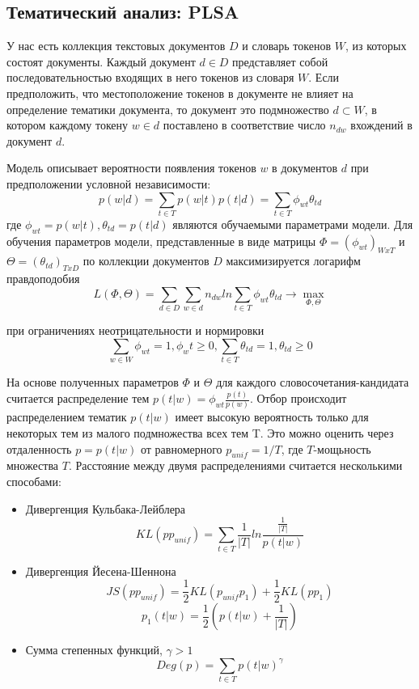\subsection*{Тематический анализ: PLSA}

У нас есть коллекция текстовых документов $D$ и словарь токенов $W$, из которых состоят документы. Каждый документ $d \in D$ представляет собой последовательностью входящих в него токенов из словаря $W$. Если предположить, что местоположение токенов в документе не влияет на определение тематики документа, то документ это подмножество $d \subset W$, в котором каждому токену $w \in d$ поставлено в соответствие число $n_{dw}$ вхождений в документ $d$.

Модель описывает вероятности появления токенов $w$ в документов $d$ при предположении условной независимости:
$$p(w|d) = \sum_{t \in T} p(w|t)p(t|d) = \sum_{t \in T} \phi_{wt} \theta_{td}$$
где $\phi_{wt} = p(w|t), \theta_{td} = p(t|d)$ являются обучаемыми параметрами модели. Для обучения параметров модели, представленные в виде матрицы $\Phi = (\phi_{wt})_{WxT}$ и $\Theta = (\theta_{td})_{TxD}$ по коллекции документов $D$ максимизируется логарифм правдоподобия
$$L(\Phi, \Theta) = \sum_{d \in D} \sum_{w \in d} n_{dw} ln \sum_{t \in T} \phi_{wt} \theta_{td} \rightarrow \max_{\Phi, \Theta}$$

при ограничениях неотрицательности и нормировки
$$\sum_{w \in W} \phi_{wt} = 1, \phi_wt \geq 0, \sum_{t \in T} \theta_{td} = 1, \theta_{td} \geq 0$$

На основе полученных параметров $\Phi$ и $\Theta$ для каждого словосочетания-кандидата считается распределение тем $p(t|w) = \phi_{wt} \frac{p(t)}{p(w)}$. Отбор происходит распределением тематик $p(t|w)$ имеет высокую вероятность только для некоторых тем из малого подмножества всех тем T. Это можно оценить через отдаленность $p = p(t|w)$ от равномерного $p_{unif} = 1/T$, где $T$-мощьность множества $T$. Расстояние между двумя распределениями считается несколькими способами:

\begin{itemize}
	\item Дивергенция Кульбака-Лейблера
	$$KL(pp_{unif}) = \sum_{t \in T} \frac{1}{|T|} ln \frac{\frac{1}{|T|}}{p(t|w)}$$
	\item Дивергенция Йесена-Шеннона
	$$JS(pp_{unif}) = \frac{1}{2}KL(p_{unif}p_{1}) + \frac{1}{2}KL(pp_{1})$$
	$$p_{1}(t|w) = \frac{1}{2}(p(t|w) + \frac{1}{|T|})$$
	\item Сумма степенных функций, $\gamma > 1$
	$$Deg(p) = \sum_{t \in T} p(t|w)^{\gamma}$$
\end{itemize}

